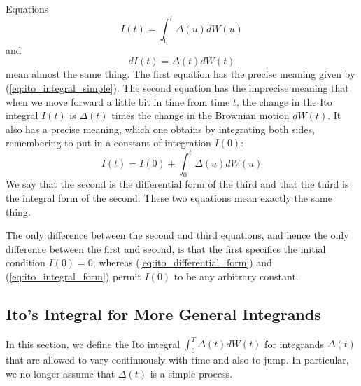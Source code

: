 \documentclass[\topdir/lecture\_notes.tex]{subfiles}
\begin{document}
\begin{remark}\label{rmk:differential_integral_forms}
Equations
\begin{equation}
I(t)=\int_{0}^{t} \Delta(u) d W(u)
\end{equation}
and
\begin{equation}
d I(t)=\Delta(t) d W(t) \label{eq:ito_differential_form}
\end{equation}
mean almost the same thing. The first equation has the precise meaning given by (\ref{eq:ito_integral_simple}). The second equation has the imprecise meaning that when we move forward a little bit in time from time $t$, the change in the Ito integral $I(t)$ is $\Delta(t)$ times the change in the Brownian motion $dW(t)$. It also has a precise meaning, which one obtains by integrating both sides, remembering to put in a constant of integration $I(0)$:
\begin{equation}
I(t)=I(0)+\int_{0}^{t} \Delta(u) dW(u) \label{eq:ito_integral_form}
\end{equation}
We say that the second is the differential form of the third and that the third is the integral form of the second. These two equations mean exactly the same thing.

The only difference between the second and third equations, and hence the only difference between the first and second, is that the first specifies the initial condition $I(0)=0$, whereas (\ref{eq:ito_differential_form}) and (\ref{eq:ito_integral_form}) permit $I(0)$ to be any arbitrary constant.
\end{remark}

\subsection{Ito's Integral for More General Integrands}
In this section, we define the Ito integral $\int_{0}^{T} \Delta(t) d W(t)$ for integrands $\Delta(t)$ that are allowed to vary continuously with time and also to jump. In particular, we no longer assume that $\Delta(t)$ is a simple process.
\end{document}
